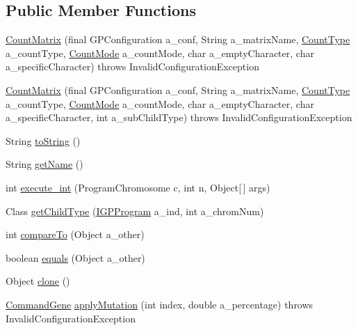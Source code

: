 \subsection*{Public Member Functions}
\begin{DoxyCompactItemize}
\item 
\hyperlink{classorg_1_1jgap_1_1gp_1_1function_1_1_count_matrix_a42a4316f077cdc038908b28ab3915732}{Count\-Matrix} (final G\-P\-Configuration a\-\_\-conf, String a\-\_\-matrix\-Name, \hyperlink{enumorg_1_1jgap_1_1gp_1_1function_1_1_count_matrix_1_1_count_type}{Count\-Type} a\-\_\-count\-Type, \hyperlink{enumorg_1_1jgap_1_1gp_1_1function_1_1_count_matrix_1_1_count_mode}{Count\-Mode} a\-\_\-count\-Mode, char a\-\_\-empty\-Character, char a\-\_\-specific\-Character)  throws Invalid\-Configuration\-Exception 
\item 
\hyperlink{classorg_1_1jgap_1_1gp_1_1function_1_1_count_matrix_a2e7fe340d41ceb8c0dd4c4daaf47cae9}{Count\-Matrix} (final G\-P\-Configuration a\-\_\-conf, String a\-\_\-matrix\-Name, \hyperlink{enumorg_1_1jgap_1_1gp_1_1function_1_1_count_matrix_1_1_count_type}{Count\-Type} a\-\_\-count\-Type, \hyperlink{enumorg_1_1jgap_1_1gp_1_1function_1_1_count_matrix_1_1_count_mode}{Count\-Mode} a\-\_\-count\-Mode, char a\-\_\-empty\-Character, char a\-\_\-specific\-Character, int a\-\_\-sub\-Child\-Type)  throws Invalid\-Configuration\-Exception 
\item 
String \hyperlink{classorg_1_1jgap_1_1gp_1_1function_1_1_count_matrix_a59216e2aea850a527c74c0dbce65467f}{to\-String} ()
\item 
String \hyperlink{classorg_1_1jgap_1_1gp_1_1function_1_1_count_matrix_a4737c5a5dcee9763433e0ff05cb7872f}{get\-Name} ()
\item 
int \hyperlink{classorg_1_1jgap_1_1gp_1_1function_1_1_count_matrix_ab6a764268e5f5d404cc6605dd8cbb8e4}{execute\-\_\-int} (Program\-Chromosome c, int n, Object\mbox{[}$\,$\mbox{]} args)
\item 
Class \hyperlink{classorg_1_1jgap_1_1gp_1_1function_1_1_count_matrix_af4b16fd7253029f765cda05dd67a8ebd}{get\-Child\-Type} (\hyperlink{interfaceorg_1_1jgap_1_1gp_1_1_i_g_p_program}{I\-G\-P\-Program} a\-\_\-ind, int a\-\_\-chrom\-Num)
\item 
int \hyperlink{classorg_1_1jgap_1_1gp_1_1function_1_1_count_matrix_a85778824472100481691a3a9fad7f222}{compare\-To} (Object a\-\_\-other)
\item 
boolean \hyperlink{classorg_1_1jgap_1_1gp_1_1function_1_1_count_matrix_acaf8f4431d7229034fa79a5a05384fe7}{equals} (Object a\-\_\-other)
\item 
Object \hyperlink{classorg_1_1jgap_1_1gp_1_1function_1_1_count_matrix_afa4320618fd8218993a108948eab66ae}{clone} ()
\item 
\hyperlink{classorg_1_1jgap_1_1gp_1_1_command_gene}{Command\-Gene} \hyperlink{classorg_1_1jgap_1_1gp_1_1function_1_1_count_matrix_a69007bff3648ff944611ff9dc2a0d84f}{apply\-Mutation} (int index, double a\-\_\-percentage)  throws Invalid\-Configuration\-Exception 
\end{DoxyCompactItemize}
